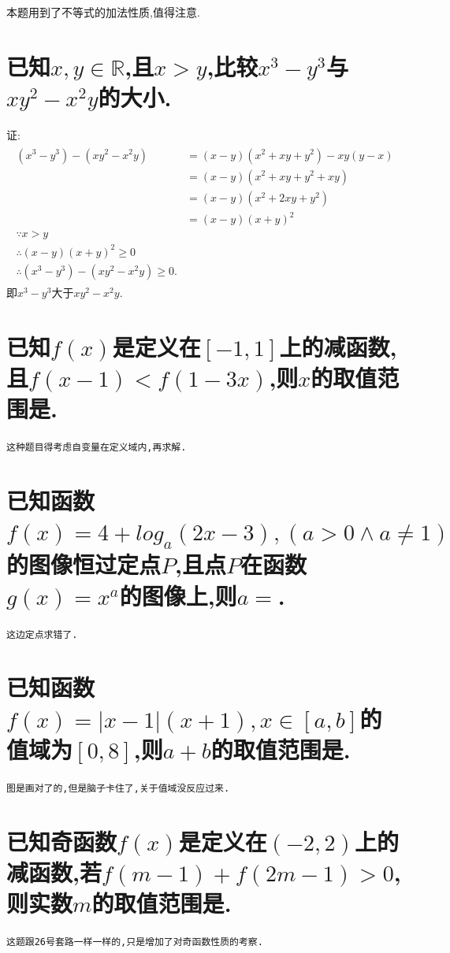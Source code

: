 \documentclass{article}
\newcommand{\1}{\underline{\makebox[1cm]{}}}
\newcommand{\2}{\underline{\makebox[2cm]{}}}
\newcommand{\3}{\underline{\makebox[3cm]{}}}
\newcommand{\4}{\underline{\makebox[4cm]{}}}
\newcommand{\blk}{\vspace*{1\baselineskip} }
\newcommand{\lge}{\large \texttt}
\newlength{\la}
\begin{document}
    \rightline{$\blacksquare$}

\Large 本题用到了不等式的加法性质,值得注意.

\blk

\section{已知$x,y\in \mathbb{R}$,且$x>y$,比较$x^3-y^3$与$xy^2-x^2y$的大小.}
    {\large
        证:\\
        \begin{align}
            \begin{aligned}
                (x^3-y^3)-(xy^2-x^2y) &= (x-y)(x^2+xy+y^2)-xy(y-x)\nonumber\\
                &=(x-y)(x^2+xy+y^2+xy)\\
                &=(x-y)(x^2+2xy+y^2)\\
                &=(x-y)(x+y)^2\\
                \because x>y\\
                \therefore (x-y)(x+y)^2 \geq 0\\
                \therefore(x^3-y^3)-(xy^2-x^2y) \geq 0.
            \end{aligned}
        \end{align} 
        即$x^3-y^3$大于$xy^2-x^2y$.\\
    }
    \rightline{$\blacksquare$}


\newpage
\section{已知$f(x)$是定义在$[-1,1]$上的减函数,且$f(x-1)<f(1-3x)$,则$x$的取值范围是\2.}
\lge{这种题目得考虑自变量在定义域内,再求解.}
\section{已知函数$f(x)=4+log_a(2x-3),(a>0\wedge a\neq 1) $的图像恒过定点$P$,且点$P$在函数$g(x)=x^a$的图像上,则$a=$\3.}
\lge{这边定点求错了.}
\section{已知函数$f(x)=|x-1|(x+1),x\in [a,b]$的值域为$[0,8]$,则$a+b$的取值范围是\3.}
\lge{图是画对了的,但是脑子卡住了,关于值域没反应过来.}
\section{已知奇函数$f(x)$是定义在$(-2,2)$上的减函数,若$f(m-1)+f(2m-1)>0$,则实数$m$的取值范围是\3.}
\lge{这题跟26号套路一样一样的,只是增加了对奇函数性质的考察.}
\end{document}
